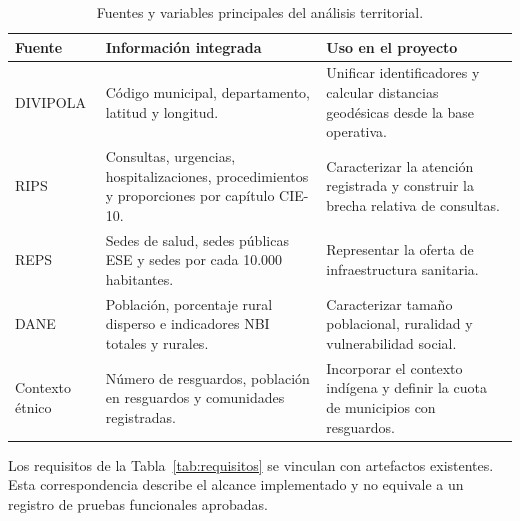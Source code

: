 \documentclass[12pt]{article}
\begin{document}
\begin{table}[H]
\centering
\small
\caption{Fuentes y variables principales del análisis territorial.}
\label{tab:fuentes_analisis}
\begin{tabular}{@{}>{\raggedright\arraybackslash}p{2.7cm}
                    >{\raggedright\arraybackslash}p{5.5cm}
                    >{\raggedright\arraybackslash}p{7cm}@{}}
\toprule
\textbf{Fuente} & \textbf{Información integrada} & \textbf{Uso en el proyecto} \\
\midrule
DIVIPOLA & Código municipal, departamento, latitud y longitud. & Unificar identificadores y calcular distancias geodésicas desde la base operativa. \\
RIPS & Consultas, urgencias, hospitalizaciones, procedimientos y proporciones por capítulo CIE-10. & Caracterizar la atención registrada y construir la brecha relativa de consultas. \\
REPS & Sedes de salud, sedes públicas ESE y sedes por cada 10.000 habitantes. & Representar la oferta de infraestructura sanitaria. \\
DANE & Población, porcentaje rural disperso e indicadores NBI totales y rurales. & Caracterizar tamaño poblacional, ruralidad y vulnerabilidad social. \\
Contexto étnico & Número de resguardos, población en resguardos y comunidades registradas. & Incorporar el contexto indígena y definir la cuota de municipios con resguardos. \\
\bottomrule
\end{tabular}
\end{table}

Los requisitos de la Tabla~\ref{tab:requisitos} se vinculan con artefactos existentes. Esta correspondencia describe el alcance implementado y no equivale a un registro de pruebas funcionales aprobadas.
\end{document}
